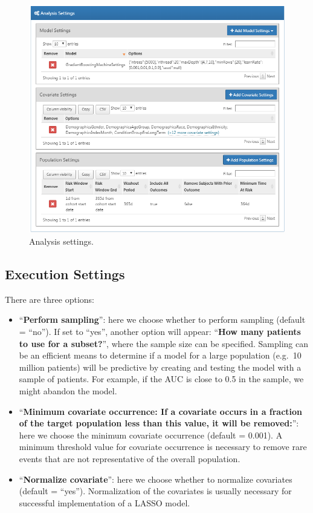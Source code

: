 \documentclass[
  11pt]{book}
\providecommand{\tightlist}{%
  \setlength{\itemsep}{0pt}\setlength{\parskip}{0pt}}
\theoremstyle{definition}
\theoremstyle{definition}
\theoremstyle{definition}
\theoremstyle{definition}
\theoremstyle{remark}
\begin{document}
\begin{figure}

{\centering \includegraphics[width=1\linewidth]{images/PatientLevelPrediction/analysisSettings} 

}

\caption{Analysis settings.}\label{fig:analysisSettings}
\end{figure}

\subsection{Execution Settings}\label{execution-settings}

There are three options:

\begin{itemize}
\tightlist
\item
  ``\textbf{Perform sampling}'': here we choose whether to perform sampling (default = ``no''). If set to ``yes'', another option will appear: ``\textbf{How many patients to use for a subset?}'', where the sample size can be specified. Sampling can be an efficient means to determine if a model for a large population (e.g.~10 million patients) will be predictive by creating and testing the model with a sample of patients. For example, if the AUC is close to 0.5 in the sample, we might abandon the model.
\item
  ``\textbf{Minimum covariate occurrence: If a covariate occurs in a fraction of the target population less than this value, it will be removed:}'': here we choose the minimum covariate occurrence (default = 0.001). A minimum threshold value for covariate occurrence is necessary to remove rare events that are not representative of the overall population.
\item
  ``\textbf{Normalize covariate}'': here we choose whether to normalize covariates (default = ``yes''). Normalization of the covariates is usually necessary for successful implementation of a LASSO model.
\end{itemize}
\end{document}
